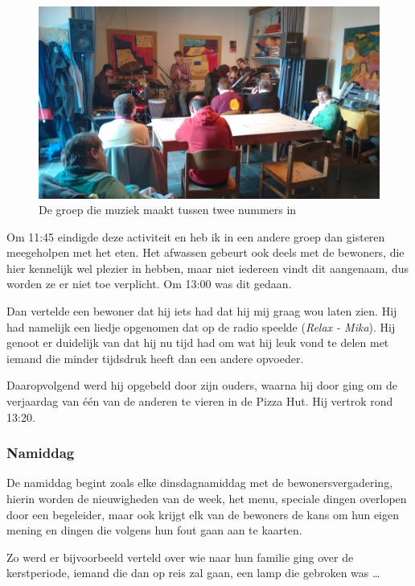 \documentclass[a4paper,12pt]{article}
\begin{document}
\begin{figure}[H]
  \centering
  \includegraphics[width=\textwidth]{./muziek.jpg}
  \caption{De groep die muziek maakt tussen twee nummers in}
\end{figure}

Om 11:45 eindigde deze activiteit en heb ik in een andere groep dan gisteren meegeholpen met het eten. Het afwassen gebeurt ook deels met de bewoners, die hier kennelijk wel plezier in hebben, maar niet iedereen vindt dit aangenaam, dus worden ze er niet toe verplicht. Om 13:00 was dit gedaan.

Dan vertelde een bewoner dat hij iets had dat hij mij graag wou laten zien. Hij had namelijk een liedje opgenomen dat op de radio speelde (\emph{Relax - Mika}). Hij genoot er duidelijk van dat hij nu tijd had om wat hij leuk vond te delen met iemand die minder tijdsdruk heeft dan een andere opvoeder.

Daaropvolgend werd hij opgebeld door zijn ouders, waarna hij door ging om de verjaardag van één van de anderen te vieren in de Pizza Hut. Hij vertrok rond 13:20.

\subsubsection{Namiddag}

De namiddag begint zoals elke dinsdagnamiddag met de bewonersvergadering, hierin worden de nieuwigheden van de week, het menu, speciale dingen overlopen door een begeleider, maar ook krijgt elk van de bewoners de kans om hun eigen mening en dingen die volgens hun fout gaan aan te kaarten.

Zo werd er bijvoorbeeld verteld over wie naar hun familie ging over de kerstperiode, iemand die dan op reis zal gaan, een lamp die gebroken was \dots
\end{document}
